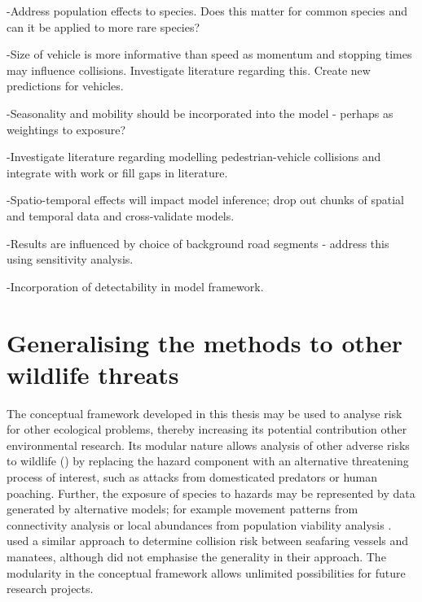 -Address population effects to species.  Does this matter for common species and can it be applied to more rare species?

-Size of vehicle is more informative than speed as momentum and stopping times may influence collisions. Investigate literature regarding this. Create new predictions for vehicles.

-Seasonality and mobility should be incorporated into the model - perhaps as weightings to exposure?

-Investigate literature regarding modelling pedestrian-vehicle collisions and integrate with work or fill gaps in literature.

-Spatio-temporal effects will impact model inference; drop out chunks of spatial and temporal data and cross-validate models.

-Results are influenced by choice of background road segments - address this using sensitivity analysis.

-Incorporation of detectability in model framework.

\section{Generalising the methods to other wildlife threats}

The conceptual framework developed in this thesis may be used to analyse risk for other ecological problems, thereby increasing its potential contribution other environmental research. Its modular nature allows analysis of other adverse risks to wildlife () by replacing the hazard component with an alternative threatening process of interest, such as attacks from domesticated predators or human poaching. Further, the exposure of species to hazards may be represented by data generated by alternative models; for example movement patterns from connectivity analysis \citep{} or local abundances from population viability analysis \citep{}. \cite{baud13} used a similar approach to determine collision risk between seafaring vessels and manatees, although did not emphasise the generality in their approach. The modularity in the conceptual framework allows unlimited possibilities for future research projects.

